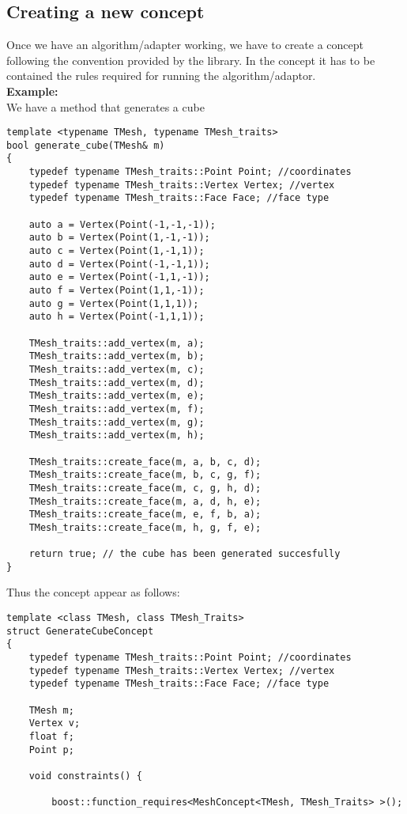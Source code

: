 \begin{appendices}
\section{Creating a new concept}

Once we have an algorithm/adapter working, we have to create a concept following the convention
provided by the library. In the concept it has to be contained the rules required for running the
algorithm/adaptor.\\

\textbf{Example:}\\
We have a method that generates a cube
\label{app:cube}
\begin{lstlisting}
template <typename TMesh, typename TMesh_traits>
bool generate_cube(TMesh& m)
{
	typedef typename TMesh_traits::Point Point; //coordinates
	typedef typename TMesh_traits::Vertex Vertex; //vertex
	typedef typename TMesh_traits::Face Face; //face type
	
	auto a = Vertex(Point(-1,-1,-1));
	auto b = Vertex(Point(1,-1,-1));
	auto c = Vertex(Point(1,-1,1));
	auto d = Vertex(Point(-1,-1,1));
	auto e = Vertex(Point(-1,1,-1));
	auto f = Vertex(Point(1,1,-1));
	auto g = Vertex(Point(1,1,1));
	auto h = Vertex(Point(-1,1,1));
	
	TMesh_traits::add_vertex(m, a);
	TMesh_traits::add_vertex(m, b);
	TMesh_traits::add_vertex(m, c);
	TMesh_traits::add_vertex(m, d);
	TMesh_traits::add_vertex(m, e);
	TMesh_traits::add_vertex(m, f);
	TMesh_traits::add_vertex(m, g);
	TMesh_traits::add_vertex(m, h);

	TMesh_traits::create_face(m, a, b, c, d);
	TMesh_traits::create_face(m, b, c, g, f);
	TMesh_traits::create_face(m, c, g, h, d);
	TMesh_traits::create_face(m, a, d, h, e);		
	TMesh_traits::create_face(m, e, f, b, a);		
	TMesh_traits::create_face(m, h, g, f, e);
	
	return true; // the cube has been generated succesfully
}
\end{lstlisting}
Thus the concept appear as follows:

\begin{lstlisting}
template <class TMesh, class TMesh_Traits>
struct GenerateCubeConcept
{
	typedef typename TMesh_traits::Point Point; //coordinates
	typedef typename TMesh_traits::Vertex Vertex; //vertex
	typedef typename TMesh_traits::Face Face; //face type

	TMesh m;
	Vertex v;
	float f;
	Point p;

	void constraints() {

		boost::function_requires<MeshConcept<TMesh, TMesh_Traits> >();


\end{lstlisting}
\end{appendices}
